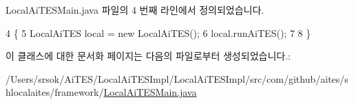 Local\+Ai\+T\+E\+S\+Main.\+java 파일의 4 번째 라인에서 정의되었습니다.


\begin{DoxyCode}
4                                            \{
5         LocalAiTES local = \textcolor{keyword}{new} LocalAiTES();
6         local.runAiTES();
7 
8     \}
\end{DoxyCode}


이 클래스에 대한 문서화 페이지는 다음의 파일로부터 생성되었습니다.\+:\begin{DoxyCompactItemize}
\item 
/\+Users/srsok/\+Ai\+T\+E\+S/\+Local\+Ai\+T\+E\+S\+Impl/\+Local\+Ai\+T\+E\+S\+Impl/src/com/github/aites/shlocalaites/framework/\mbox{\hyperlink{_local_ai_t_e_s_main_8java}{Local\+Ai\+T\+E\+S\+Main.\+java}}\end{DoxyCompactItemize}

